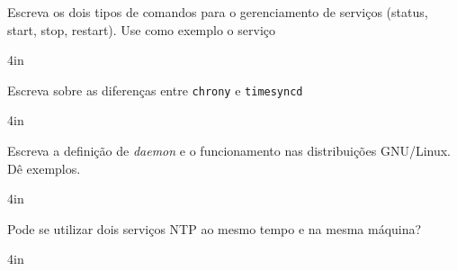 \documentclass[12pt]{exam}
\begin{document}
\noindent
%
\begin{questions}
\question Escreva os dois tipos de comandos para o gerenciamento de serviços (status, start, stop, restart). Use como exemplo o serviço 
\begin{solutionbox}{4in} 		
	\end{solutionbox}
\question Escreva sobre as diferenças entre \texttt{chrony} e \texttt{timesyncd}
\begin{solutionbox}{4in} 		
	\end{solutionbox}
\question Escreva a definição de \textit{daemon} e o funcionamento nas distribuições GNU/Linux. Dê exemplos.
\begin{solutionbox}{4in} 		
	\end{solutionbox}
\question Pode se utilizar dois serviços NTP ao mesmo tempo e na mesma máquina? 
\begin{solutionbox}{4in} 		
	\end{solutionbox}






\end{questions}
\end{document}
